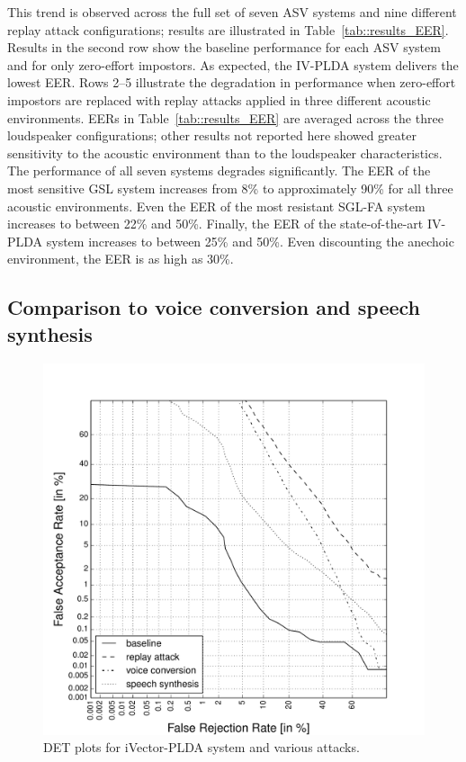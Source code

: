 This trend is observed across the full set of seven ASV systems and nine different replay attack configurations;  
results are illustrated in Table~\ref{tab::results_EER}.
Results in the second row show the baseline performance for each ASV system and for only zero-effort impostors.
As expected, the IV-PLDA system delivers the lowest EER.
Rows 2--5 illustrate the degradation in performance when zero-effort impostors are replaced with replay attacks applied in three different acoustic environments.
EERs in Table~\ref{tab::results_EER} are averaged across the three loudspeaker configurations; other results not reported here showed greater sensitivity to the acoustic environment than to the loudspeaker characteristics.  
The performance of all seven systems degrades significantly.
The EER of the most sensitive GSL system increases from 8\% to approximately 90\% for all three acoustic environments.
Even the EER of the most resistant SGL-FA system increases to between 22\% and 50\%.  
Finally, the EER of the state-of-the-art IV-PLDA system increases to between 25\% and 50\%.  Even discounting the anechoic environment, the EER is as high as 30\%.


\subsection{Comparison to voice conversion and speech synthesis}

\begin{figure}[!t]
	\centering
	\includegraphics[width=1\linewidth]{Figs/DETs_IV_ss_vc_rp.pdf}
	\caption{DET plots for iVector-PLDA system and various attacks.}
	\label{fig::DETs_4attacks}
\end{figure}

